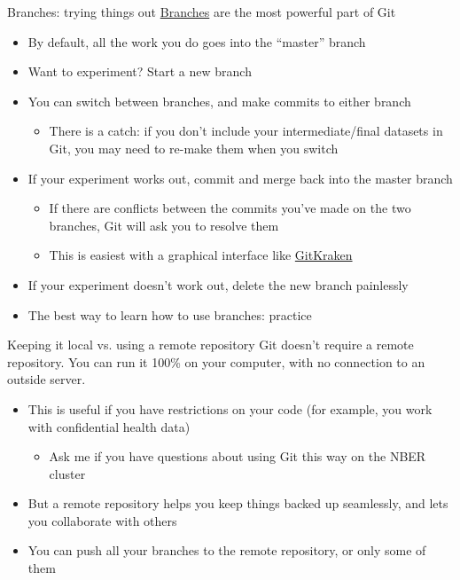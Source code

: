 \documentclass{beamer}
\begin{document}
\begin{frame}{Branches: trying things out}
\href{https://git-scm.com/book/en/v2/Git-Branching-Branches-in-a-Nutshell}{Branches} are the most powerful part of Git
\begin{itemize}
\item By default, all the work you do goes into the ``master'' branch
\item Want to experiment? Start a new branch
\item You can switch between branches, and make commits to either branch
\begin{itemize}
\item There is a catch: if you don't include your intermediate/final datasets in Git, you may need to re-make them when you switch
\end{itemize}
\item If your experiment works out, commit and merge back into the master branch
\begin{itemize}
\item If there are conflicts between the commits you've made on the two branches, Git will ask you to resolve them
\item This is easiest with a graphical interface like \href{https://support.gitkraken.com/working-with-repositories/branching-and-merging/}{GitKraken}
\end{itemize}
\item If your experiment doesn't work out, delete the new branch painlessly
\item The best way to learn how to use branches: practice
\end{itemize}
\end{frame}

\begin{frame}{Keeping it local vs. using a remote repository}
Git doesn't require a remote repository. You can run it 100\% on your computer, with no connection to an outside server.
\begin{itemize}
\item This is useful if you have restrictions on your code (for example, you work with confidential health data)
\begin{itemize}
\item Ask me if you have questions about using Git this way on the NBER cluster
\end{itemize}
\item But a remote repository helps you keep things backed up seamlessly, and lets you collaborate with others
\item You can push all your branches to the remote repository, or only some of them
\end{itemize}

\end{frame}
\end{document}
